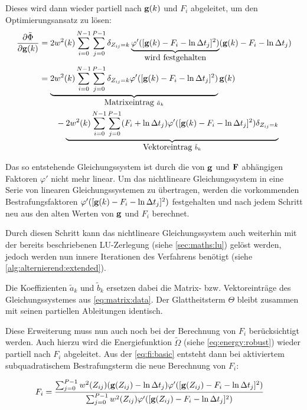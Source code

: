 Dieses wird dann wieder partiell nach $\mathbf g(k)$ und $F_i$ abgeleitet, um den Optimierungsansatz zu lösen:
\begin{align}
\frac{\partial \tilde{\Phi}}{\partial \mathbf g(k)}  &= 
    2 w^2(k) \sum_{i=0}^{N-1} \sum_{j=0}^{P-1}\delta_{Z_{ij}=k} 
    \underbrace{
        \varphi'(
            [\mathbf g(k)-F_i - \ln \Delta t_j]^2
        )
    }_{\mbox{wird festgehalten}}
    (\mathbf g(k)-F_i - \ln \Delta t_j)
    \\
    & = \underbrace{
        2w^2(k)\sum_{i=0}^{N-1} \sum_{j=0}^{P-1}  
            \delta_{Z_{ij}=k}
            \varphi'(
                [\mathbf g(k)-F_i - \ln \Delta t_j]^2
            )
    }_{\mbox{Matrixeintrag } \tilde{a}_k}\mathbf g(k) \nonumber \\
    &\qquad -  
    \underbrace{
        2w^2(k)\sum_{i=0}^{N-1} \sum_{j=0}^{P-1} 
            (F_i +\ln \Delta t_j)
            \varphi'(
                [\mathbf g(k)-F_i - \ln \Delta t_j]^2
            )
            \delta_{Z_{ij}=k}
    }_{\mbox{Vektoreintrag }\tilde{b}_k}
\end{align}

Das so entstehende Gleichungssystem ist durch die von $\mathbf g$ und $\mathbf F$ abhängigen Faktoren $\varphi'$ nicht mehr linear. Um das nichtlineare Gleichungssystem in eine Serie von linearen Gleichungssystemen zu übertragen, werden die vorkommenden Bestrafungsfaktoren $\varphi'([\mathbf g(k)-F_i - \ln \Delta t_j]^2)$ festgehalten und nach jedem Schritt neu aus den alten Werten von $\mathbf g$ und $F_i$ berechnet. 

Durch diesen Schritt kann das nichtlineare Gleichungssystem auch weiterhin mit der bereits beschriebenen LU-Zerlegung (siehe \autoref{sec:maths:lu}) gelöst werden, jedoch werden nun innere Iterationen des Verfahrens benötigt (siehe \autoref{alg:alternierend:extended}).

Die Koeffizienten $\tilde a_k$ und $\tilde b_k$ ersetzen dabei die Matrix- bzw. Vektoreinträge des Gleichungssystemes aus \autoref{eq:matrix:data}. Der Glattheitsterm $\Theta$ bleibt zusammen mit seinen partiellen Ableitungen identisch. 

Diese Erweiterung muss nun auch noch bei der Berechnung von $F_i$ berücksichtigt werden. Auch hierzu wird die Energiefunktion $\tilde{\Omega}$ (siehe \autoref{eq:energy:robust}) wieder partiell nach $F_i$ abgeleitet. Aus der \autoref{eq:fi:basic} entsteht dann bei aktiviertem subquadratischem Bestrafungsterm die neue Berechnung von $F_i$:

\begin{align}
    \label{eq:f_i:robust}
    F_i 	&= \frac{
        \sum_{j=0}^{P-1} 
            w^2(Z_{ij})
            (\mathbf g(Z_{ij})-\ln \Delta t_j)
            \varphi'(
                [\mathbf g(Z_{ij})-F_i - \ln \Delta t_j]^2
            )
    }
    {
        \sum_{j=0}^{P-1} 
            w^2(Z_{ij})
            \varphi'(
                [\mathbf g(Z_{ij})-F_i - \ln \Delta t_j]^2
            )
    }
\end{align}

